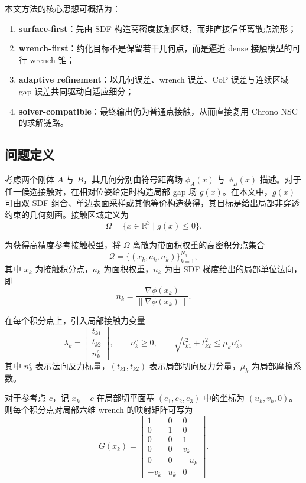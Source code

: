 \documentclass[UTF8,a4paper,11pt]{ctexart}
\begin{document}
本文方法的核心思想可概括为：
\begin{enumerate}[label=(\arabic*)]
    \item \textbf{surface-first}：先由 SDF 构造高密度接触区域，而非直接信任离散点流形；
    \item \textbf{wrench-first}：约化目标不是保留若干几何点，而是逼近 dense 接触模型的可行 wrench 锥；
    \item \textbf{adaptive refinement}：以几何误差、wrench 误差、CoP 误差与连续区域 gap 误差共同驱动自适应细分；
    \item \textbf{solver-compatible}：最终输出仍为普通点接触，从而直接复用 Chrono NSC 的求解链路。
\end{enumerate}

\subsection{问题定义}

考虑两个刚体 $A$ 与 $B$，其几何分别由符号距离场 $\phi_A(x)$ 与 $\phi_B(x)$ 描述。对于任一候选接触对，在相对位姿给定时构造局部 gap 场 $g(x)$。在本文中，$g(x)$ 可由双 SDF 组合、单边表面采样或其他等价构造获得，其目标是给出局部非穿透约束的几何刻画。接触区域定义为
\begin{equation}
\Omega = \{x \in \mathbb{R}^3 \mid g(x) \le 0\}.
\end{equation}

为获得高精度参考接触模型，将 $\Omega$ 离散为带面积权重的高密积分点集合
\begin{equation}
\mathcal{Q} = \{(x_k, a_k, n_k)\}_{k=1}^{N_q},
\end{equation}
其中 $x_k$ 为接触积分点，$a_k$ 为面积权重，$n_k$ 为由 SDF 梯度给出的局部单位法向，即
\begin{equation}
 n_k = \frac{\nabla \phi(x_k)}{\|\nabla \phi(x_k)\|}.
\end{equation}

在每个积分点上，引入局部接触力变量
\begin{equation}
\lambda_k =
\begin{bmatrix}
 t_{k1} \\
 t_{k2} \\
 n_k^c
\end{bmatrix},
\qquad
n_k^c \ge 0,
\qquad
\sqrt{t_{k1}^2 + t_{k2}^2} \le \mu_k n_k^c,
\end{equation}
其中 $n_k^c$ 表示法向反力标量，$(t_{k1}, t_{k2})$ 表示局部切向反力分量，$\mu_k$ 为局部摩擦系数。

对于参考点 $c$，记 $x_k-c$ 在局部切平面基 $(e_1,e_2,e_3)$ 中的坐标为 $(u_k,v_k,0)$。则每个积分点对局部六维 wrench 的映射矩阵可写为
\begin{equation}
G(x_k) =
\begin{bmatrix}
1 & 0 & 0 \\
0 & 1 & 0 \\
0 & 0 & 1 \\
0 & 0 & v_k \\
0 & 0 & -u_k \\
-v_k & u_k & 0
\end{bmatrix}.
\end{equation}
\end{document}
